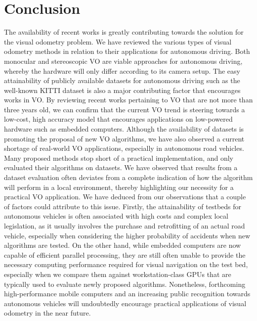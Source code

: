 \section{Conclusion}\label{sec:3:concl}
The availability of recent works is greatly contributing towards the solution for the visual odometry problem. We have reviewed the various types of visual odometry methods in relation to their applications for autonomous driving. Both monocular and stereoscopic VO are viable approaches for autonomous driving, whereby the hardware will only differ according to its camera setup. The easy attainability of publicly available datasets for autonomous driving such as the well-known KITTI dataset is also a major contributing factor that encourages works in VO. By reviewing recent works pertaining to VO that are not more than three years old, we can confirm that the current VO trend is steering towards a low-cost, high accuracy model that encourages applications on low-powered hardware such as embedded computers. Although the availability of datasets is promoting the proposal of new VO algorithms, we have also observed a current shortage of real-world VO applications, especially in autonomous road vehicles. Many proposed methods stop short of a practical implementation, and only evaluated their algorithms on datasets. We have observed that results from a dataset evaluation often deviates from a complete indication of how the algorithm will perform in a local environment, thereby highlighting our necessity for a practical VO application. We have deduced from our observations that a couple of factors could attribute to this issue. Firstly, the attainability of testbeds for autonomous vehicles is often associated with high costs and complex local legislation, as it usually involves the purchase and retrofitting of an actual road vehicle, especially when considering the higher probability of accidents when new algorithms are tested. On the other hand, while embedded computers are now capable of efficient parallel processing, they are still often unable to provide the necessary computing performance required for visual navigation on the test bed, especially when we compare them against workstation-class GPUs that are typically used to evaluate newly proposed algorithms. Nonetheless, forthcoming high-performance mobile computers and an increasing public recognition towards autonomous vehicles will undoubtedly encourage practical applications of visual odometry in the near future.
